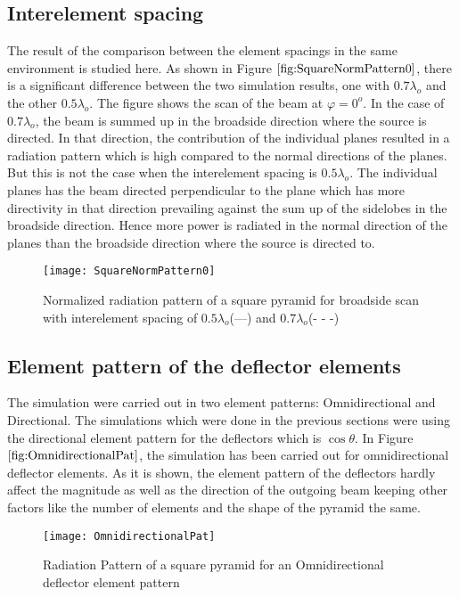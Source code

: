 \documentclass[titlepage]{article}
\begin{document}
\subsection{Interelement spacing}
The result of the comparison between the element spacings in the same environment is studied here. As shown in Figure $\ref{fig:SquareNormPattern0}$, there is a significant difference between the two simulation results, one with $0.7\lambda_o$ and the other $0.5\lambda_o$. The figure shows the scan of the beam at $\varphi =0^o$. In the case of $0.7\lambda_o$, the beam is summed up in the broadside direction where the source is directed. In that direction, the contribution of the individual planes resulted in a radiation pattern which is high compared to the normal directions of the planes.
\newline
But this is not the case when the interelement spacing is $0.5\lambda_o$. The individual planes has the beam directed perpendicular to the plane which has more directivity in that direction prevailing against the sum up of the sidelobes in the broadside direction. Hence more power is radiated in the normal direction of the planes than the broadside direction where the source is directed to.
\begin{figure}[!hbp]
\centering
\texttt{[image: SquareNormPattern0]}
\caption{Normalized radiation pattern of a square pyramid for broadside scan with interelement spacing of $0.5\lambda_o$(---) and $0.7\lambda_o$(- - -)}
\label{fig:SquareNormPattern0}
\end{figure}
\subsection{Element pattern of the deflector elements}
The simulation were carried out in two element patterns: Omnidirectional and Directional. The simulations which were done in the previous sections were using the directional element pattern for the deflectors which is $\cos\theta$. In Figure $\ref{fig:OmnidirectionalPat}$, the simulation has been carried out for omnidirectional deflector elements. As it is shown, the element pattern of the deflectors hardly affect the magnitude as well as the direction of the outgoing beam keeping other factors like the number of elements and the shape of the pyramid the same.
\begin{figure}[!hbp]
\centering
\texttt{[image: OmnidirectionalPat]}
\caption{Radiation Pattern of a square pyramid for an Omnidirectional deflector element pattern}
\label{fig:OmnidirectionalPat}
\end{figure}
\end{document}
